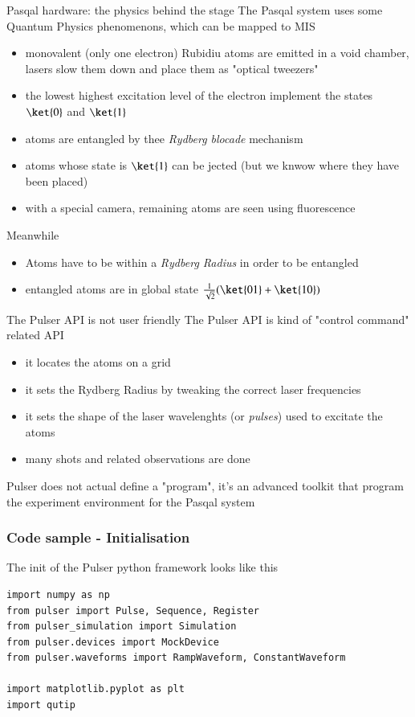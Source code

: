\begin{frame}{Pasqal hardware: the physics behind the stage}
The Pasqal system  uses some Quantum Physics phenomenons, which can be mapped to MIS
\begin{itemize}
    \item monovalent (only one electron) Rubidiu atoms are emitted in a void chamber, lasers slow them down and
    place them as "optical tweezers"
    \item the lowest highest excitation level of the electron implement the states $\ket{0}$ and $\ket{1}$
    \item atoms are entangled by thee \textit{Rydberg blocade} mechanism
    \item atoms whose state is $\ket{1}$ can be jected (but we knwow where they have been placed)
    \item with a special camera, remaining atoms are seen using fluorescence 
\end{itemize}
Meanwhile
\begin{itemize}
    \item Atoms have to be within a \textit{Rydberg Radius} in order to be entangled
    \item entangled atoms are in global state $\frac{1}{\sqrt{2}}(\ket{01}+\ket{10})$
\end{itemize}
\end{frame}

\begin{frame}{The Pulser API is not user friendly}
The Pulser API is kind of "control command" related API
\begin{itemize}
    \item it locates the atoms on a grid
    \item it sets the Rydberg Radius by tweaking the correct laser frequencies
    \item it sets the shape of the laser wavelenghts (or \textit{pulses}) used to excitate the atoms  
    \item many shots and related observations are done
\end{itemize}
Pulser does not actual define a "program", it's an advanced toolkit that program the experiment environment for the 
Pasqal system
\end{frame}

\begin{frame}[fragile]
\frametitle{Code sample - Initialisation}
The init of the Pulser python framework looks like this
\newline
\begin{verbatim}
import numpy as np
from pulser import Pulse, Sequence, Register
from pulser_simulation import Simulation
from pulser.devices import MockDevice
from pulser.waveforms import RampWaveform, ConstantWaveform

import matplotlib.pyplot as plt
import qutip
\end{verbatim}
\end{frame}

